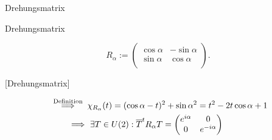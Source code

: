 \documentclass[class=article, crop=false]{standalone}
\begin{document}
\begin{zettel}{Drehungsmatrix}
\begin{flashcard}[h9drfi1i]{Drehungsmatrix}
	\begin{definition}
		\[
			R_{\alpha} :=
			\begin{pmatrix}
				\cos \alpha & -  \sin \alpha \\
				\sin \alpha & \cos \alpha    \\
			\end{pmatrix}
		.\]
	\end{definition}[Drehungsmatrix]
\end{flashcard}

\begin{remark}
	\begin{align*}
		\stackrel{\tx{ Definition } }{\implies} & \chi_{R_{\alpha}}(t) = ( \cos \alpha - t)^2 + \sin \alpha^2 = t^2 - 2t \cos \alpha +1 \\
		\implies                                & \exists T \in  U(2) : \bar{T}^t R_{\alpha} T =
		\begin{pmatrix}
			e^{i\alpha} & 0            \\
			0           & e^{-i\alpha} \\
		\end{pmatrix}
	\end{align*}
\end{remark}
\end{zettel}
\end{document}
